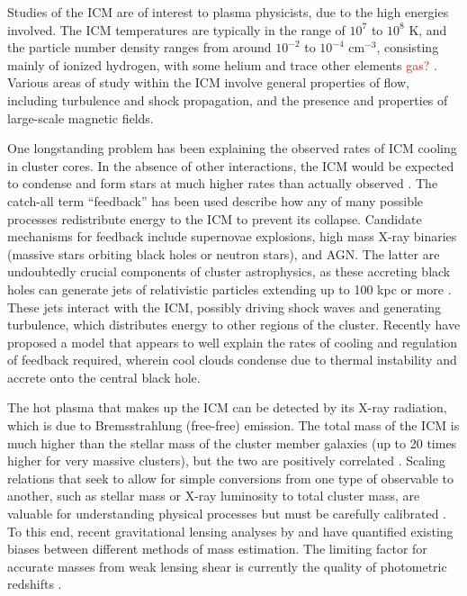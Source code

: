 Studies of the \ac{ICM} are of interest to plasma physicists, due to the high energies involved. The \ac{ICM} temperatures are typically in the range of $10^7$ to $10^8$ K, and the particle number density ranges from around $10^{-2}$ to $10^{-4}$ cm$^{-3}$, consisting mainly of ionized hydrogen, with some helium and trace other elements \textcolor{red}{gas?} \citep{Markevitch07}. Various areas of study within the \ac{ICM} involve general properties of flow, including turbulence and shock propagation, and the presence and properties of large-scale magnetic fields. 

One longstanding problem has been explaining the observed rates of \ac{ICM} cooling in cluster cores. In the absence of other interactions, the \ac{ICM} would be expected to condense and form stars at much higher rates than actually observed \citep{Fabian94}. The catch-all term ``feedback'' has been used describe how any of many possible processes redistribute energy to the \ac{ICM} to prevent its collapse. Candidate mechanisms for feedback include supernovae explosions, high mass X-ray binaries (massive stars orbiting black holes or neutron stars), and \ac{AGN}. The latter are undoubtedly crucial components of cluster astrophysics, as these accreting black holes can generate jets of relativistic particles extending up to 100 kpc or more \citep{Fabian12}. These jets interact with the \ac{ICM}, possibly driving shock waves and generating turbulence, which distributes energy to other regions of the cluster. Recently \citet{Voit15} have proposed a model that appears to well explain the rates of cooling and regulation of feedback required, wherein cool clouds condense due to thermal instability and accrete onto the central black hole.

The hot plasma that makes up the \ac{ICM} can be detected by its X-ray radiation, which is due to Bremsstrahlung (free-free) emission. The total mass of the \ac{ICM} is much higher than the stellar mass of the cluster member galaxies (up to 20 times higher for very massive clusters), but the two are positively correlated \citep{Kravtsov12}. Scaling relations that seek to allow for simple conversions from one type of observable to another, such as stellar mass or X-ray luminosity to total cluster mass, are valuable for understanding physical processes but must be carefully calibrated \citep{Leauthaud10}. To this end, recent gravitational lensing analyses by \citet{Applegate14} and \citet{Hoekstra15} have quantified existing biases between different methods of mass estimation. The limiting factor for accurate masses from weak lensing shear is currently the quality of photometric redshifts \citep{Hoekstra15}.

